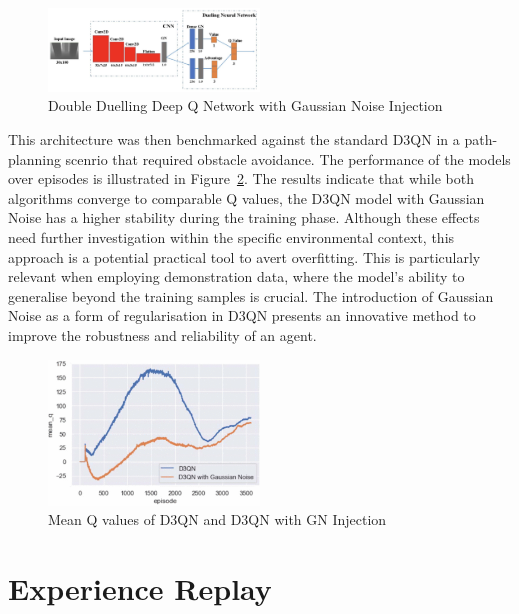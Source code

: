\begin{figure}[htbp]
  \centering
  \includegraphics[width=0.5\textwidth]{background/fyp13-noise-injection.png}
  \caption{Double Duelling Deep Q Network with Gaussian Noise Injection}
\label{fig:fyp13-d3qn-noise}
\end{figure}

This architecture was then benchmarked against the standard D3QN in a path-planning scenrio that required obstacle avoidance.
The performance of the models over episodes is illustrated in Figure~\ref{fig:fyp13-results}.
The results indicate that while both algorithms converge to comparable Q values, the D3QN model with Gaussian Noise has a higher stability during the training phase.
Although these effects need further investigation within the specific environmental context, this approach is a potential practical tool to avert overfitting. 
This is particularly relevant when employing demonstration data, where the model's ability to generalise beyond the training samples is crucial. 
The introduction of Gaussian Noise as a form of regularisation in D3QN presents an innovative method to improve the robustness and reliability of an agent.

\begin{figure}[H]
  \centering
  \includegraphics[width=0.5\textwidth]{background/fyp13-noise-results.png}
  \caption{Mean Q values of D3QN and D3QN with GN Injection}
\label{fig:fyp13-results}
\end{figure}

\section{Experience Replay}
\label{sec:background-experience-replay}

